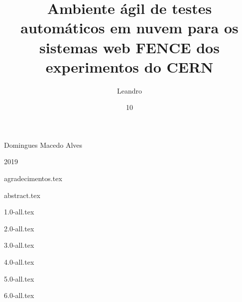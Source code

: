 \documentclass[grad,numbers]{style/coppe}
\begin{document}
  \title{Ambiente ágil de testes automáticos em nuvem para os sistemas web FENCE dos experimentos do CERN}
  \foreigntitle{}
  \author{Leandro}{Domingues Macedo Alves}

  
  \date{10}{2019}


  \maketitle

  \frontmatter
  
  \makecatalog

  {agradecimentos.tex}
  
  {abstract.tex}

  \tableofcontents
  \listoffigures
  \printlosymbols
  \printloabbreviations

  \mainmatter

  {1.0-all.tex}
  
  {2.0-all.tex}
  
  {3.0-all.tex}

  {4.0-all.tex}

  {5.0-all.tex}

  {6.0-all.tex}

  \backmatter
  \nocite{*}
  \label{bibliografia}
  
\end{document}
